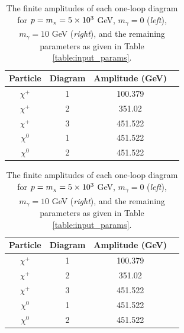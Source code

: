 \documentclass[11pt]{article}
\newcommand{\mychi}{\raisebox{0pt}[1ex][1ex]{\tiny$\chi$}}
\def\mc{m_{\mychi}}
\begin{document}
\begin{table}[h!]
\caption{The finite amplitudes of each one-loop diagram for $p=\mc=5\times10^3$ GeV, $m_{\gamma}=0$ (\textit{left}), $m_{\gamma}=10$ GeV (\textit{right}), and the remaining parameters as given in Table \ref{table:input_params}.}\label{table:diagram_amp}
\centering
\vspace{0.2cm}
\begin{tabular}{c c c c}
Particle & Diagram & Amplitude (GeV) \\
\hline
$\chi^+$ & 1 & 100.379\\
$\chi^+$ & 2 & 351.02\\
$\chi^+$ & 3 & 451.522\\
$\chi^0$ & 1 & 451.522\\
$\chi^0$ & 2 & 451.522\\
\hline\end{tabular}
\begin{tabular}{c c c c}
Particle & Diagram & Amplitude (GeV) \\
\hline
$\chi^+$ & 1 & 100.379\\
$\chi^+$ & 2 & 351.02\\
$\chi^+$ & 3 & 451.522\\
$\chi^0$ & 1 & 451.522\\
$\chi^0$ & 2 & 451.522\\
\hline\end{tabular}
\end{table}
\end{document}
